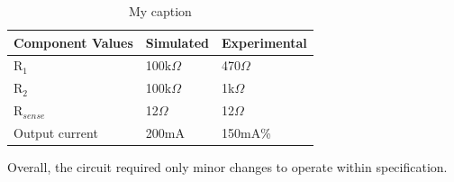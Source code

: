 \begin{table}[H]
	\centering
	\caption{My caption}
	\label{tab:currentdriver}
	\begin{tabular}{|l|l|l|}
		\hline
		Component Values & Simulated  & Experimental \\ \hline
		R$_1$            & 100k$\Omega$      & 470$\Omega$        \\ \hline
		R$_2$            & 100k$\Omega$      & 1k$\Omega$      \\ \hline
		R$_{sense}$      & 12$\Omega$ & 12$\Omega$   \\ \hline
		Output current   & 200mA       & 150mA\%       \\ \hline
	\end{tabular}
\end{table}

Overall, the circuit required only minor changes to operate within specification.

